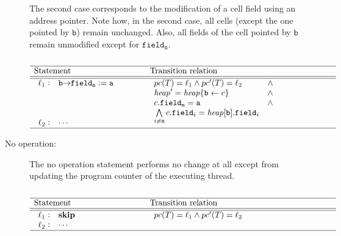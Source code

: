 \begin{description}
		The second case corresponds to the modification of a cell field using 
		an address pointer.
%
		Note how, in the second case, all cells (except the one pointed by 
		$\mathtt{b}$) remain unchanged.
%
		Also, all fields of the cell pointed by $\mathtt{b}$ remain unmodified 
		except for $\mathtt{field_n}$.

\[
\begin{array}[t]{p{8em}@{\hspace{6em}}p{\longtablesize}}
				\hline
				Statement & Transition relation \\ \hline\hline
				$\begin{array}[t]{l@{\hspace{0.3em}}c@{\hspace{1em}}l}
					\ell_1 & : & \mathtt{b \pointsto field_n := a} \\ \\ \\ \\
					\ell_2 & : & \mathtt{\cdots}
				\end{array}$
				&
				$\begin{array}[t]{ll}
					\pc(T) = \ell_1 \andcond \pc'(T) = \ell_2 & \andcond \\
					\heap' = \heap \{ \mathtt{b} \leftarrow c \} & \andcond \\
					c.\mathtt{field_n} = \mathtt{a} & \andcond \\
					\bigwedge\limits_{i \neq \mathtt{n}} c.\mathtt{field}_i = 
					\heap[\mathtt{b}].\mathtt{field}_i
				\end{array}$\\ \hline
	\end{array}
\]
	\item [No operation:]
		The no operation statement performs no change at all except from 
		updating the program counter of the executing thread.

\[
\begin{array}[t]{p{8em}@{\hspace{6em}}p{\longtablesize}}
	\hline
	Statement & Transition relation \\ \hline\hline
	$\begin{array}[t]{l@{\hspace{0.3em}}c@{\hspace{1em}}l}
		\ell_1 & : & \mathtt{\SkipStm} \\
		\ell_2 & : & \mathtt{\cdots}
	\end{array}$
	&
	$\begin{array}[t]{ll}
		 \pc(T) = \ell_1 \andcond
		 \pc'(T) = \ell_2
	 \end{array}$ \\ \hline
\end{array}
\]	


\end{description}
